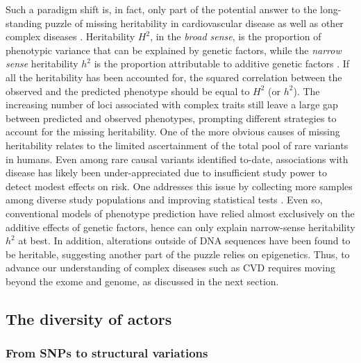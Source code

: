 \documentclass[letter]{bib}
\begin{document}
Such a paradigm shift is, in fact, only part of the potential answer to the long-standing puzzle of missing heritability in cardiovascular disease as well as other complex diseases \citep{Manolio:2009:Finding}. Heritability $H^2$, in the \textit{broad sense}, is the proportion of phenotypic variance that can be explained by genetic factors, while the \textit{narrow sense} heritability $h^2$ is the proportion attributable to additive genetic factors \citep{Manolio:2009:Finding}.
If all the heritability has been accounted for, the squared correlation between the observed and the predicted phenotype should be equal to $H^2$ (or $h^2$). The increasing number of loci associated with complex traits still leave a large gap between predicted and observed phenotypes, prompting different strategies to account for the missing heritability.  One of the more obvious causes of missing heritability relates to the limited ascertainment of the total pool of rare variants in humans. Even among rare causal variants identified to-date, associations with disease has likely been under-appreciated due to insufficient study power to detect modest effects on risk. One addresses this issue by collecting more samples among diverse study populations \citep{Visscher:2017:10, Lek:2016:Analysis} and improving statistical tests \citep{Zuk:2014:Searching,Kaakinen:2017:rarevariant}. Even so, conventional models of phenotype prediction have relied almost exclusively on the additive effects of genetic factors, hence can only explain narrow-sense heritability $h^2$ at best. In addition, alterations outside of DNA sequences have been found to be heritable, suggesting another part of the puzzle relies on epigenetics. Thus, to advance our understanding of complex diseases such as CVD requires moving beyond the exome and genome, as discussed in the next section.
	
	
\subsection*{The diversity of actors}

\subsubsection*{From SNPs to structural variations}
\end{document}
